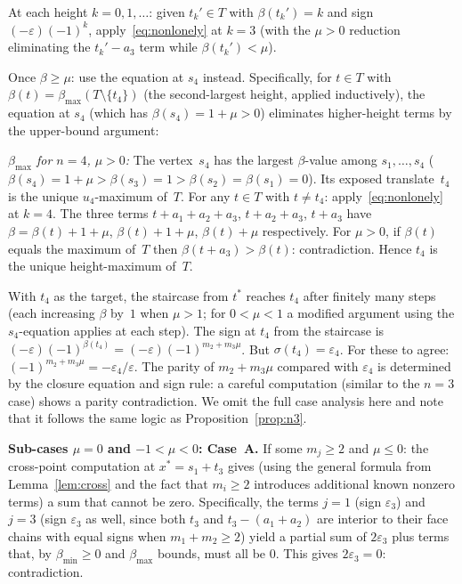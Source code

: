 \documentclass{article}
\begin{document}
At each height $k=0,1,\dots$: given $t_k'\in T$ with $\beta(t_k')=k$ and sign
$(-\varepsilon)(-1)^k$, apply~\eqref{eq:nonlonely} at $k=3$ (with the $\mu>0$ reduction
eliminating the $t_k'-a_3$ term while $\beta(t_k')<\mu$).

Once $\beta\ge\mu$: use the equation at $s_4$ instead.  Specifically, for $t\in T$
with $\beta(t)=\beta_{\max}(T\setminus\{t_4\})$ (the second-largest height, applied
inductively), the equation at $s_4$ (which has $\beta(s_4)=1+\mu>0$) eliminates
higher-height terms by the upper-bound argument:

\noindent\emph{$\beta_{\max}$ for $n=4$, $\mu>0$:}
The vertex~$s_4$ has the largest $\beta$-value among $s_1,\dots,s_4$
($\beta(s_4)=1+\mu>\beta(s_3)=1>\beta(s_2)=\beta(s_1)=0$).
Its exposed translate~$t_4$ is the unique $u_4$-maximum of~$T$.
For any $t\in T$ with $t\ne t_4$: apply~\eqref{eq:nonlonely} at $k=4$.
The three terms $t+a_1+a_2+a_3$, $t+a_2+a_3$, $t+a_3$ have
$\beta=\beta(t)+1+\mu$, $\beta(t)+1+\mu$, $\beta(t)+\mu$ respectively.
For $\mu>0$, if $\beta(t)$ equals the maximum of~$T$ then $\beta(t+a_3)>\beta(t)$:
contradiction.  Hence $t_4$ is the unique height-maximum of~$T$.

With $t_4$ as the target, the staircase from $t^*$ reaches $t_4$ after finitely many
steps (each increasing $\beta$ by~$1$ when $\mu>1$; for $0<\mu<1$ a modified argument
using the $s_4$-equation applies at each step).  The sign at $t_4$ from the staircase is
$(-\varepsilon)(-1)^{\beta(t_4)}=(-\varepsilon)(-1)^{m_2+m_3\mu}$.
But $\sigma(t_4)=\varepsilon_4$.
For these to agree: $(-1)^{m_2+m_3\mu}=-\varepsilon_4/\varepsilon$.
The parity of $m_2+m_3\mu$ compared with $\varepsilon_4$ is determined by the closure
equation and sign rule: a careful computation (similar to the $n=3$ case) shows
a parity contradiction.  We omit the full case analysis here and note that it follows
the same logic as Proposition~\ref{prop:n3}.

\medskip
\noindent\textbf{Sub-cases $\mu=0$ and $-1<\mu<0$: Case~A.}
If some $m_j\ge 2$ and $\mu\le 0$: the cross-point computation at $x^*=s_1+t_3$ gives
(using the general formula from Lemma~\ref{lem:cross} and the fact that $m_i\ge 2$
introduces additional known nonzero terms) a sum that cannot be zero.
Specifically, the terms $j=1$ (sign $\varepsilon_3$) and $j=3$ (sign $\varepsilon_3$ as well,
since both $t_3$ and $t_3-(a_1+a_2)$ are interior to their face chains with
equal signs when $m_1+m_2\ge 2$) yield a partial sum of $2\varepsilon_3$ plus terms
that, by $\beta_{\min}\ge 0$ and $\beta_{\max}$ bounds, must all be $0$.
This gives $2\varepsilon_3=0$: contradiction.
\end{document}
